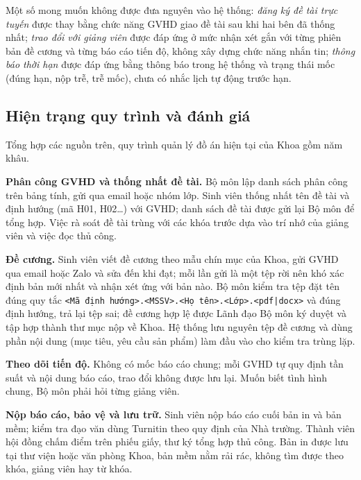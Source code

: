 \documentclass[../main.tex]{subfiles}
\begin{document}
Một số mong muốn không được đưa nguyên vào hệ thống: \textit{đăng ký đề tài trực tuyến} được thay bằng chức năng GVHD giao đề tài sau khi hai bên đã thống nhất; \textit{trao đổi với giảng viên} được đáp ứng ở mức nhận xét gắn với từng phiên bản đề cương và từng báo cáo tiến độ, không xây dựng chức năng nhắn tin; \textit{thông báo thời hạn} được đáp ứng bằng thông báo trong hệ thống và trạng thái mốc (đúng hạn, nộp trễ, trễ mốc), chưa có nhắc lịch tự động trước hạn.

\subsection{Hiện trạng quy trình và đánh giá}\label{sec:c2-hien-trang}

Tổng hợp các nguồn trên, quy trình quản lý đồ án hiện tại của Khoa gồm năm khâu.

\textbf{Phân công GVHD và thống nhất đề tài.} Bộ môn lập danh sách phân công trên bảng tính, gửi qua email hoặc nhóm lớp. Sinh viên thống nhất tên đề tài và định hướng (mã H01, H02\ldots) với GVHD; danh sách đề tài được gửi lại Bộ môn để tổng hợp. Việc rà soát đề tài trùng với các khóa trước dựa vào trí nhớ của giảng viên và việc đọc thủ công.

\textbf{Đề cương.} Sinh viên viết đề cương theo mẫu chín mục của Khoa, gửi GVHD qua email hoặc Zalo và sửa đến khi đạt; mỗi lần gửi là một tệp rời nên khó xác định bản mới nhất và nhận xét ứng với bản nào. Bộ môn kiểm tra tệp đặt tên đúng quy tắc \texttt{\textless{}Mã định hướng\textgreater{}.\textless{}MSSV\textgreater{}.\textless{}Họ tên\textgreater{}.\textless{}Lớp\textgreater{}.\textless{}pdf|docx\textgreater{}} và đúng định hướng, trả lại tệp sai; đề cương hợp lệ được Lãnh đạo Bộ môn ký duyệt và tập hợp thành thư mục nộp về Khoa. Hệ thống lưu nguyên tệp đề cương và dùng phần nội dung (mục tiêu, yêu cầu sản phẩm) làm đầu vào cho kiểm tra trùng lặp.

\textbf{Theo dõi tiến độ.} Không có mốc báo cáo chung; mỗi GVHD tự quy định tần suất và nội dung báo cáo, trao đổi không được lưu lại. Muốn biết tình hình chung, Bộ môn phải hỏi từng giảng viên.

\textbf{Nộp báo cáo, bảo vệ và lưu trữ.} Sinh viên nộp báo cáo cuối bản in và bản mềm; kiểm tra đạo văn dùng Turnitin theo quy định của Nhà trường. Thành viên hội đồng chấm điểm trên phiếu giấy, thư ký tổng hợp thủ công. Bản in được lưu tại thư viện hoặc văn phòng Khoa, bản mềm nằm rải rác, không tìm được theo khóa, giảng viên hay từ khóa.
\end{document}
